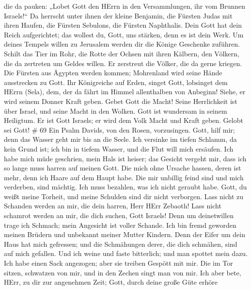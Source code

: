 die da pauken:  „Lobet Gott den HErrn in den Versammlungen,
ihr vom Brunnen Israels!{}``  Da herrscht unter ihnen der
kleine Benjamin, die Fürsten Judas mit ihren Haufen, die Fürsten
Sebulons, die Fürsten Naphthalis.  Dein Gott hat dein Reich
aufgerichtet; das wollest du, Gott, uns stärken, denn es ist dein Werk.
 Um deines Tempels willen zu Jerusalem werden dir die
Könige Geschenke zuführen.  Schilt das Tier im Rohr, die
Rotte der Ochsen mit ihren Kälbern, den Völkern, die da zertreten um
Geldes willen. Er zerstreut die Völker, die da gerne kriegen.
 Die Fürsten aus Ägypten werden kommen; Mohrenland wird
seine Hände ausstrecken zu Gott.  Ihr Königreiche auf
Erden, singet Gott, lobsinget dem HErrn (Sela),  dem, der
da fährt im Himmel allenthalben von Anbeginn! Siehe, er wird seinem
Donner Kraft geben.  Gebet Gott die Macht! Seine
Herrlichkeit ist über Israel, und seine Macht in den Wolken.
 Gott ist wundersam in seinem Heiligtum. Er ist Gott
Israels; er wird dem Volk Macht und Kraft geben. Gelobt sei Gott! \# 69
 Ein Psalm Davids, von den Rosen, vorzusingen. 
Gott, hilf mir; denn das Wasser geht mir bis an die Seele. 
Ich versinke im tiefen Schlamm, da kein Grund ist; ich bin in tiefem
Wasser, und die Flut will mich ersäufen.  Ich habe mich müde
geschrien, mein Hals ist heiser; das Gesicht vergeht mir, dass ich so
lange muss harren auf meinen Gott.  Die mich ohne Ursache
hassen, deren ist mehr, denn ich Haare auf dem Haupt habe. Die mir
unbillig feind sind und mich verderben, sind mächtig. Ich muss bezahlen,
was ich nicht geraubt habe.  Gott, du weißt meine Torheit,
und meine Schulden sind dir nicht verborgen.  Lass nicht zu
Schanden werden an mir, die dein harren, Herr HErr Zebaoth! Lass nicht
schamrot werden an mir, die dich suchen, Gott Israels!  Denn
um deinetwillen trage ich Schmach; mein Angesicht ist voller Schande.
 Ich bin fremd geworden meinen Brüdern und unbekannt meiner
Mutter Kindern.  Denn der Eifer um dein Haus hat mich
gefressen; und die Schmähungen derer, die dich schmähen, sind auf mich
gefallen.  Und ich weine und faste bitterlich; und man
spottet mein dazu.  Ich habe einen Sack angezogen; aber sie
treiben Gespött mit mir.  Die im Tor sitzen, schwatzen von
mir, und in den Zechen singt man von mir.  Ich aber bete,
HErr, zu dir zur angenehmen Zeit; Gott, durch deine große Güte erhöre
